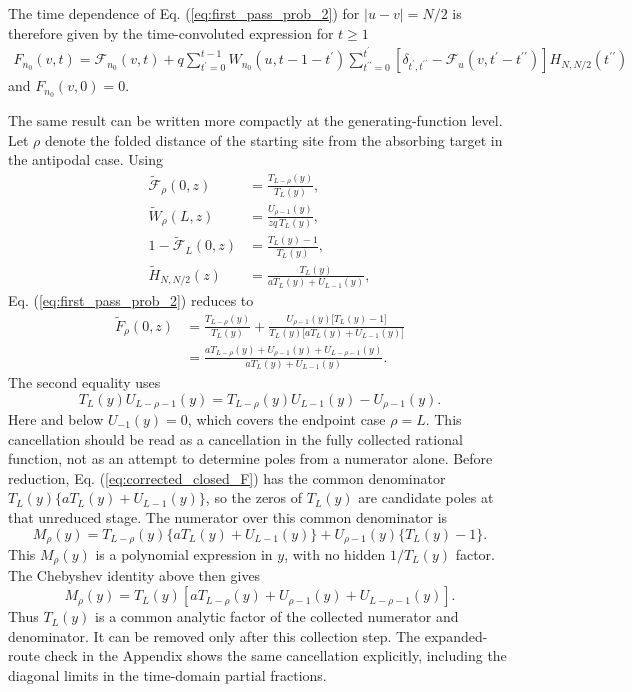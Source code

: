 \documentclass[superscriptaddress, amsmath, amssymb, aps, pre, floatfix]{revtex4-2}
\begin{document}
The time dependence of Eq. (\ref{eq:first_pass_prob_2}) for $|u-v|=N/2$ is therefore given by the time-convoluted expression for $t\geq 1$
\begin{align}
F_{n_0}(v,t)=\mathcal{F}_{n_0}(v,t)+q\sum_{t^{\prime}=0}^{t-1}W_{n_0}(u,t-1-t^{\prime})\sum_{t^{\prime\prime}=0}^{t^{\prime}}\left[\delta_{t^{\prime},t^{\prime\prime}}-\mathcal{F}_{u}(v,t^{\prime}-t^{\prime\prime})\right]H_{N,N/2}(t^{\prime\prime})
\label{eq:fp_time}
\end{align}
and $F_{n_0}(v,0)=0$.

The same result can be written more compactly at the generating-function level.  Let \(\rho\) denote the folded distance of the starting site from the absorbing target in the antipodal case.  Using
\begin{align}
  \widetilde{\mathcal F}_{\rho}(0,z)&=\frac{T_{L-\rho}(y)}{T_L(y)},\\
  \widetilde W_{\rho}(L,z)&=\frac{U_{\rho-1}(y)}{zq\,T_L(y)},\\
  1-\widetilde{\mathcal F}_{L}(0,z)&=\frac{T_L(y)-1}{T_L(y)},\\
  \widetilde H_{N,N/2}(z)&=\frac{T_L(y)}{aT_L(y)+U_{L-1}(y)},
\end{align}
Eq. (\ref{eq:first_pass_prob_2}) reduces to
\begin{align}
\widetilde F_{\rho}(0,z)
&=
\frac{T_{L-\rho}(y)}{T_L(y)}
+\frac{U_{\rho-1}(y)\bigl[T_L(y)-1\bigr]}
{T_L(y)\bigl[aT_L(y)+U_{L-1}(y)\bigr]} \nonumber\\
&=
\frac{aT_{L-\rho}(y)+U_{\rho-1}(y)+U_{L-\rho-1}(y)}
{aT_L(y)+U_{L-1}(y)}.
\label{eq:corrected_closed_F}
\end{align}
The second equality uses
\[
  T_L(y)U_{L-\rho-1}(y)=T_{L-\rho}(y)U_{L-1}(y)-U_{\rho-1}(y).
\]
Here and below \(U_{-1}(y)=0\), which covers the endpoint case \(\rho=L\).
This cancellation should be read as a cancellation in the fully collected rational function, not as an attempt to determine poles from a numerator alone.  Before reduction, Eq. (\ref{eq:corrected_closed_F}) has the common denominator \(T_L(y)\{aT_L(y)+U_{L-1}(y)\}\), so the zeros of \(T_L(y)\) are candidate poles at that unreduced stage.  The numerator over this common denominator is
\[
  M_\rho(y)=T_{L-\rho}(y)\{aT_L(y)+U_{L-1}(y)\}
  +U_{\rho-1}(y)\{T_L(y)-1\}.
\]
This \(M_\rho(y)\) is a polynomial expression in \(y\), with no hidden \(1/T_L(y)\) factor.  The Chebyshev identity above then gives
\[
  M_\rho(y)=T_L(y)\left[aT_{L-\rho}(y)+U_{\rho-1}(y)+U_{L-\rho-1}(y)\right].
\]
Thus \(T_L(y)\) is a common analytic factor of the collected numerator and denominator.  It can be removed only after this collection step.  The expanded-route check in the Appendix shows the same cancellation explicitly, including the diagonal limits in the time-domain partial fractions.
\end{document}
